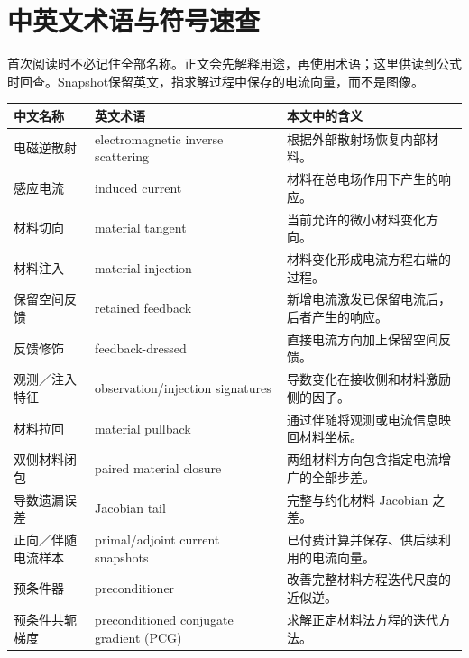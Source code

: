\section*{中英文术语与符号速查}
首次阅读时不必记住全部名称。正文会先解释用途，再使用术语；这里供读到公式时回查。Snapshot保留英文，指求解过程中保存的电流向量，而不是图像。

\noindent\begin{tabular}{p{.23\linewidth}p{.32\linewidth}p{.36\linewidth}}
\toprule 中文名称 & 英文术语 & 本文中的含义\\\midrule
电磁逆散射 & electromagnetic inverse scattering & 根据外部散射场恢复内部材料。\\
感应电流 & induced current & 材料在总电场作用下产生的响应。\\
材料切向 & material tangent & 当前允许的微小材料变化方向。\\
材料注入 & material injection & 材料变化形成电流方程右端的过程。\\
保留空间反馈 & retained feedback & 新增电流激发已保留电流后，后者产生的响应。\\
反馈修饰 & feedback-dressed & 直接电流方向加上保留空间反馈。\\
观测／注入特征 & observation/injection signatures & 导数变化在接收侧和材料激励侧的因子。\\
材料拉回 & material pullback & 通过伴随将观测或电流信息映回材料坐标。\\
双侧材料闭包 & paired material closure & 两组材料方向包含指定电流增广的全部步差。\\
导数遗漏误差 & Jacobian tail & 完整与约化材料 Jacobian 之差。\\
正向／伴随电流样本 & primal/adjoint current snapshots & 已付费计算并保存、供后续利用的电流向量。\\
预条件器 & preconditioner & 改善完整材料方程迭代尺度的近似逆。\\
预条件共轭梯度 & preconditioned conjugate gradient (PCG) & 求解正定材料法方程的迭代方法。\\
\bottomrule\end{tabular}
\clearpage
